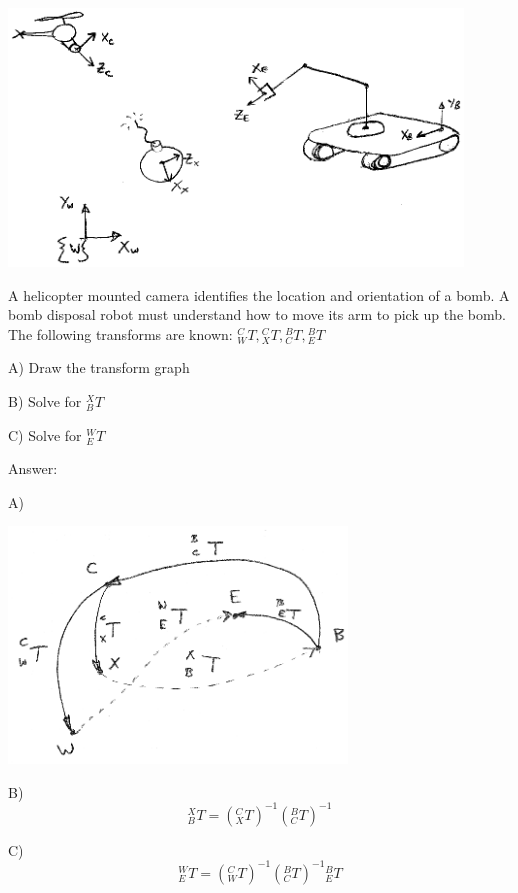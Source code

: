 \begin{Example}

\includegraphics[width=4.75in]{figs02/00487.eps}

A helicopter mounted camera identifies the location and orientation of a bomb.  A bomb disposal robot must understand how to move its arm to pick up the bomb.  The following transforms are known:  ${^C_WT},{^C_XT},{^B_CT},{^B_ET}$

A) Draw the transform graph

B) Solve for ${^X_BT}$

C) Solve for ${^W_ET}$

Answer:

A)

\includegraphics[width=90mm]{figs02/00579.eps}

B)
\[
{^X_BT} = (^C_XT)^{-1}(^B_CT)^{-1}
\]

C)
\[
{^W_ET} = (^C_WT)^{-1}(^B_CT)^{-1}{^B_ET}
\]
\end{Example}


